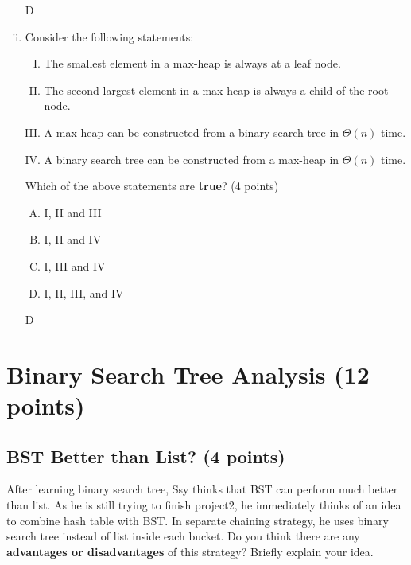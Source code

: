 \documentclass[11pt]{exam}
\begin{document}
\begin{enumerate}[i)]
          \begin{solution}
              D
          \end{solution}

    \item Consider the following statements:
          \begin{enumerate}[I.]
              \item The smallest element in a max-heap is always at a leaf node.
              \item The second largest element in a max-heap is always a child of the root node.
              \item A max-heap can be constructed from a binary search tree in $\Theta(n)$ time.
              \item A binary search tree can be constructed from a max-heap in $\Theta(n)$ time.
          \end{enumerate}
          Which of the above statements are \textbf{true}? (4 points)
          \begin{enumerate}[A.]
              \item I, II and III
              \item I, II and IV
              \item I, III and IV
              \item I, II, III, and IV
          \end{enumerate}

          \begin{solution}
              D
          \end{solution}
\end{enumerate}

\section{Binary Search Tree Analysis (12 points)}
\subsection{BST Better than List? (4 points)}
After learning binary search tree, Ssy thinks that BST can perform much better than list. As he is still trying to finish project2, he immediately thinks of an idea to combine hash table with BST. In separate chaining strategy, he uses binary search tree instead of list inside each bucket. Do you think there are any \textbf{advantages or disadvantages} of this strategy? Briefly explain your idea.
\end{document}
